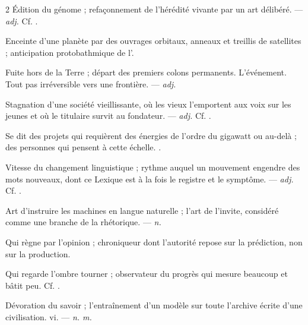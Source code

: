 \begin{multicols}{2}
 Édition du génome ; refaçonnement de l'hérédité vivante par un art délibéré.  —  \textit{adj.} Cf. .

 Enceinte d'une planète par des ouvrages orbitaux, anneaux et treillis de satellites ; anticipation protobathmique de l'.

 Fuite hors de la Terre ; départ des premiers colons permanents.  L'événement.   Tout pas irréversible vers une frontière. —  \textit{adj.}

 Stagnation d'une société vieillissante, où les vieux l'emportent aux voix sur les jeunes et où le titulaire survit au fondateur. —  \textit{adj.} Cf. .

 Se dit des projets qui requièrent des énergies de l'ordre du gigawatt ou au-delà ; des personnes qui pensent à cette échelle. .

 Vitesse du changement linguistique ; rythme auquel un mouvement engendre des mots nouveaux, dont ce Lexique est à la fois le registre et le symptôme. —  \textit{adj.} Cf. .

 Art d'instruire les machines en langue naturelle ; l'art de l'invite, considéré comme une branche de la rhétorique.  —  \textit{n.}

  Qui règne par l'opinion ; chroniqueur dont l'autorité repose sur la prédiction, non sur la production.

 Qui regarde l'ombre tourner ; observateur du progrès qui mesure beaucoup et bâtit peu. Cf. .

 Dévoration du savoir ; l'entraînement d'un modèle sur toute l'archive écrite d'une civilisation.   vi. —  \textit{n. m.}


\end{multicols}

